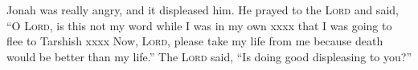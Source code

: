 
\begin{inparaenum}
     Jonah was really angry, and it displeased him.%
     He prayed to the \textsc{Lord} and said, ``O \textsc{Lord}, is this not my word while I was in my own xxxx that I was going to flee to Tarshish xxxx%
     Now, \textsc{Lord}, please take my life from me because death would be better than my life.''%
     The \textsc{Lord} said, ``Is doing good displeasing to you?''%
\end{inparaenum}
